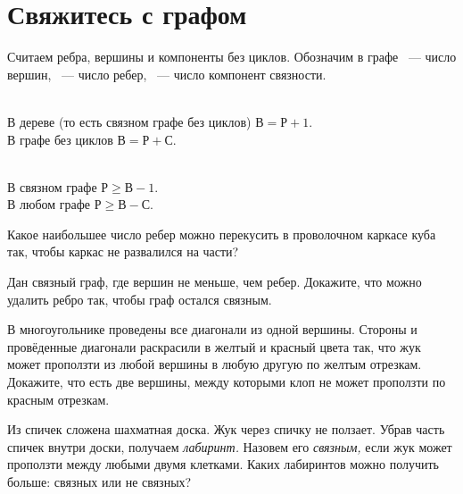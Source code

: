 
\section*{Свяжитесь с графом}




Считаем ребра, вершины и компоненты без циклов.
Обозначим в графе
~--- число вершин,
~--- число ребер,
~--- число компонент связности.

\setcounter{jeolmsubproblem}{0}
\\
\subproblem
В дереве (то есть связном графе без циклов) $\text{В} = \text{Р} + 1$.
\\
\subproblem
В графе без циклов $\text{В} = \text{Р} + \text{С}$.

\setcounter{jeolmsubproblem}{0}
\\
\subproblem
В связном графе $\text{Р} \geq \text{В} - 1$.
\\
\subproblem
В любом графе $\text{Р} \geq \text{В} - \text{С}$.

\begin{problems}

\item
Какое наибольшее число ребер можно перекусить в проволочном каркасе куба так,
чтобы каркас не развалился на части?

\item
Дан связный граф, где вершин не меньше, чем ребер.
Докажите, что можно удалить ребро так, чтобы граф остался связным.

\item
В многоугольнике проведены все диагонали из одной вершины.
Стороны и провёденные диагонали раскрасили в желтый и красный цвета так, что
жук может проползти из любой вершины в любую другую по желтым отрезкам.
Докажите, что есть две вершины, между которыми клоп не может проползти
по красным отрезкам.

\item
Из спичек сложена шахматная доска.
Жук через спичку не ползает.
Убрав часть спичек внутри доски, получаем \emph{лабиринт.}
Назовем его \emph{связным,} если жук может проползти между любыми двумя клетками.
Каких лабиринтов можно получить больше: связных или не связных?

\end{problems}

